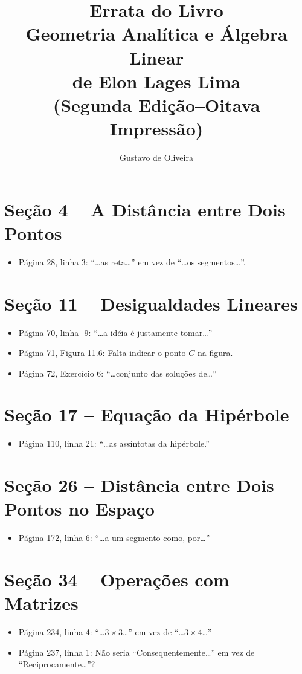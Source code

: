 \documentclass[a4paper,11pt]{article}
\title{Errata do Livro\\Geometria Analítica e Álgebra Linear\\de Elon Lages Lima\\(Segunda Edição--Oitava Impressão)}
\author{Gustavo de Oliveira}
\begin{document}
\maketitle

\section*{Seção 4 -- A Distância entre Dois Pontos}

\begin{itemize}
  \item
    Página 28, linha 3: ``\dots as reta\dots'' em vez de ``\dots os segmentos\dots''.
\end{itemize}

\section*{Seção 11 -- Desigualdades Lineares}

\begin{itemize}
  \item
    Página 70, linha -9: ``\dots a idéia é justamente tomar\dots''
  \item
    Página 71, Figura 11.6: Falta indicar o ponto $C$ na figura.
  \item
    Página 72, Exercício 6: ``\dots conjunto das soluções de\dots''
\end{itemize}

\section*{Seção 17 -- Equação da Hipérbole}

\begin{itemize}
  \item
    Página 110, linha 21: ``\dots as assíntotas da hipérbole.''
\end{itemize}

\section*{Seção 26 -- Distância entre Dois Pontos no Espaço}

\begin{itemize}
  \item
    Página 172, linha 6: ``\dots a um segmento como, por\dots''
\end{itemize}

\section*{Seção 34 -- Operações com Matrizes}

\begin{itemize}
  \item
    Página 234, linha 4: ``\dots $3 \times 3$\dots'' em vez de ``\dots $3 \times 4$\dots''
  \item
    Página 237, linha 1: Não seria ``Consequentemente\dots'' em vez de ``Reciprocamente\dots''?
\end{itemize}
\end{document}

